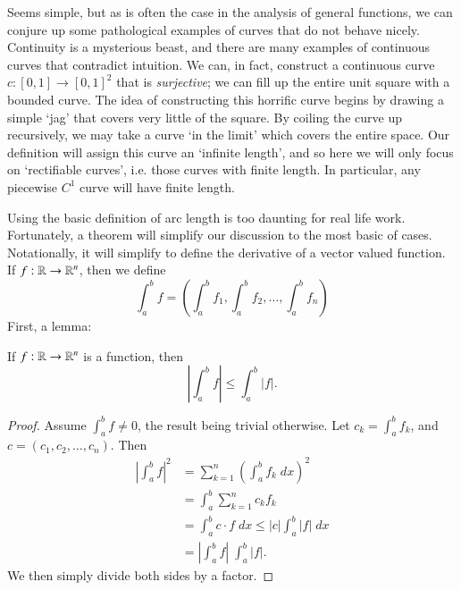 
Seems simple, but as is often the case in the analysis of general functions, we can conjure up some pathological examples of curves that do not behave nicely. Continuity is a mysterious beast, and there are many examples of continuous curves that contradict intuition. We can, in fact, construct a continuous curve $c: [0,1] \to [0,1]^2$ that is \emph{surjective}; we can fill up the entire unit square with a bounded curve. The idea of constructing this horrific curve begins by drawing a simple `jag' that covers very little of the square. By coiling the curve up recursively, we may take a curve `in the limit' which covers the entire space. Our definition will assign this curve an `infinite length', and so here we will only focus on `rectifiable curves', i.e. those curves with finite length. In particular, any piecewise $C^1$ curve will have finite length.


Using the basic definition of arc length is too daunting for real life work. Fortunately, a theorem will simplify our discussion to the most basic of cases. Notationally, it will simplify to define the derivative of a vector valued function. If $f: \operatorname{\mathbb{R}} \to \operatorname{\mathbb{R}}^n$, then we define
%
\[ \int_a^b f = \left( \int_a^b f_1, \int_a^b f_2, \dots, \int_a^b f_n \right) \]
%
First, a lemma:
%
\begin{lemma}
    If $f:\operatorname{\mathbb{R}} \to \operatorname{\mathbb{R}}^n$ is a function, then
    \[ \left| \int_a^b f \right| \leq \int_a^b |f|. \]
\end{lemma}
%
\begin{proof}
  Assume $\int_a^b f \neq 0$, the result being trivial otherwise. Let $c_k = \int_a^b f_k$, and $c = (c_1, c_2, \dots, c_n)$. Then
    \begin{align*}
        \left| \int_a^b f \right|^2 &= \sum_{k = 1}^n \left( \int_a^b f_k\; dx \right)^2\\
        &= \int_a^b \sum_{k = 1}^n c_k f_k\\
        &= \int_a^b c \cdot f\; dx \leq |c| \int_a^b |f|\; dx\\
        &= \left| \int_a^b f \right|\; \int_a^b |f|.
    \end{align*}
    We then simply divide both sides by a factor.
\end{proof}

